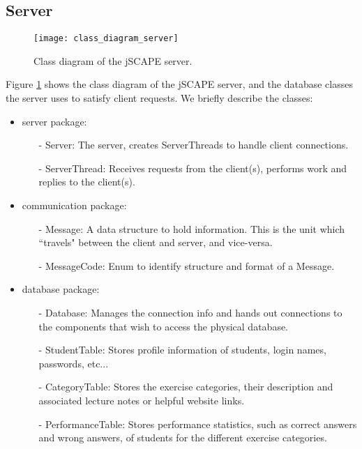 \subsection{Server}
\begin{figure}[H]
\centering
\texttt{[image: class\_diagram\_server]}
\caption{Class diagram of the jSCAPE server.}
\label{fig:class_diagram_server}
\end{figure}

Figure \ref{fig:class_diagram_server} shows the class diagram of the jSCAPE server, and the database classes the server uses to satisfy client requests. We briefly describe the classes:
\begin{itemize}
\item \textsf{server} package:
      \begin{itemize}
      \item[-] \textsf{Server}: The server, creates \textsf{ServerThread}s to handle client connections.
      \item[-] \textsf{ServerThread}: Receives requests from the client(s), performs work and replies to the client(s).
      \end{itemize}
\item \textsf{communication} package:
      \begin{itemize}
      \item[-] \textsf{Message}: A data structure to hold information. This is the unit which ``travels" between the client and server, and vice-versa.
      \item[-] \textsf{MessageCode}: Enum to identify structure and format of a \textsf{Message}.
      \end{itemize}     
\item \textsf{database} package:
      \begin{itemize}
      \item[-] \textsf{Database}: Manages the connection info and hands out connections to the components that wish to access the physical database.
      \item[-] \textsf{StudentTable}: Stores profile information of students, login names, passwords, etc...
      \item[-] \textsf{CategoryTable}: Stores the exercise categories, their description and associated lecture notes or helpful website links.
      \item[-] \textsf{PerformanceTable}: Stores performance statistics, such as correct answers and wrong answers, of students for the different exercise categories.

\end{itemize}
\end{itemize}
